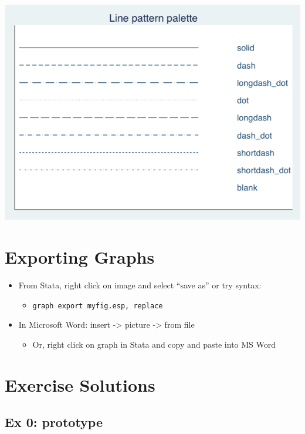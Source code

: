 \documentclass[
]{book}
\providecommand{\tightlist}{%
  \setlength{\itemsep}{0pt}\setlength{\parskip}{0pt}}
\begin{document}
\includegraphics{Stata/StataModGraph/images/linepalette.png}

\hypertarget{exporting-graphs}{%
\section{Exporting Graphs}\label{exporting-graphs}}

\begin{itemize}
\tightlist
\item
  From Stata, right click on image and select ``save as'' or try syntax:

  \begin{itemize}
  \tightlist
  \item
    \texttt{graph\ export\ myfig.esp,\ replace}
  \end{itemize}
\item
  In Microsoft Word: insert -\textgreater{} picture -\textgreater{} from file

  \begin{itemize}
  \tightlist
  \item
    Or, right click on graph in Stata and copy and paste into MS Word
  \end{itemize}
\end{itemize}

\hypertarget{exercise-solutions-8}{%
\section{Exercise Solutions}\label{exercise-solutions-8}}

\hypertarget{ex-0-prototype-8}{%
\subsection{Ex 0: prototype}\label{ex-0-prototype-8}}
\end{document}
